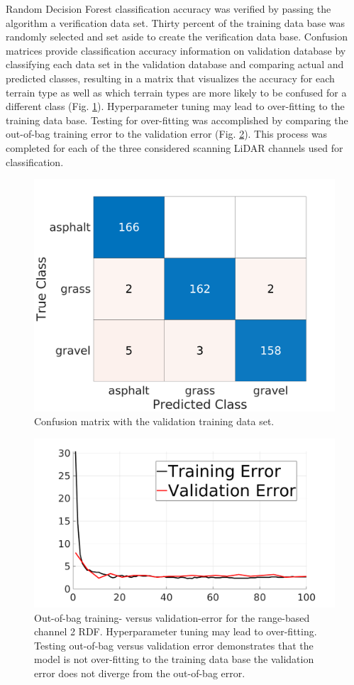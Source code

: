 \documentclass[numbered,pdftex]{ohio-etd}
\begin{document}
{{		{Random Decision Forest classification accuracy was verified by passing the algorithm a verification data set. Thirty percent of the training data base was randomly selected and set aside to create the verification data base. Confusion matrices provide classification accuracy information on validation database by classifying each data set in the validation database and comparing actual and predicted classes, resulting in a matrix that visualizes the accuracy for each terrain type as well as which terrain types are more likely to be confused for a different class (Fig. \ref{fig:vali_err_conf_mat_range}). Hyperparameter tuning may lead to over-fitting to the training data base. Testing for over-fitting was accomplished by comparing the out-of-bag training error to the validation error (Fig. \ref{fig:train_vs_valid_overfit_test2}). This process was completed for each of the three considered scanning LiDAR channels used for classification. }
						
		\begin{figure}[H]
			\centering
			\includegraphics[width=0.65\linewidth]{Defense_Images/chan_2c_conf_VALIDATION_mat222}
			\caption[Validation Error]{Confusion matrix with the validation training data set.}
			\label{fig:vali_err_conf_mat_range}
		\end{figure}
	
		\begin{figure}[H]
			\centering
			\includegraphics[width=0.75\linewidth]{Defense_Images/train_vs_valid_overfit_test2}
			\caption[Training vs Validation Error]{Out-of-bag training- versus validation-error for the range-based channel 2 RDF. Hyperparameter tuning may lead to over-fitting. Testing out-of-bag versus validation error demonstrates that the model is not over-fitting to the training data base the validation error does not diverge from the out-of-bag error.}
			\label{fig:train_vs_valid_overfit_test2}
		\end{figure}
			


}}
\end{document}
